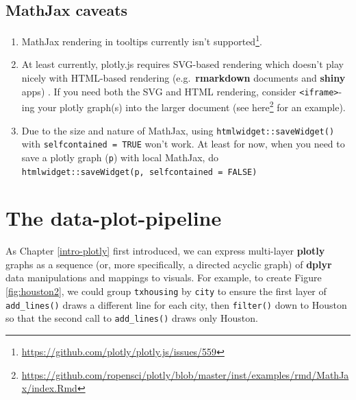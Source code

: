 \documentclass[
  12pt,
]{krantz}
\renewcommand{\href}[2]{#2\footnote{\url{#1}}}
\begin{document}
\hypertarget{mathjax-caveats}{%
\section{MathJax caveats}\label{mathjax-caveats}}

\begin{enumerate}
\def\labelenumi{\arabic{enumi}.}
\item
  MathJax rendering in tooltips \href{https://github.com/plotly/plotly.js/issues/559}{currently isn't supported}.
\item
  At least currently, plotly.js requires SVG-based rendering which doesn't play nicely with HTML-based rendering (e.g.~\textbf{rmarkdown} documents and \textbf{shiny} apps) . If you need both the SVG and HTML rendering, consider \texttt{\textless{}iframe\textgreater{}}-ing your plotly graph(s) into the larger document (see \href{https://github.com/ropensci/plotly/blob/master/inst/examples/rmd/MathJax/index.Rmd}{here} for an example).
\item
  Due to the size and nature of MathJax, using \texttt{htmlwidget::saveWidget()} with \texttt{selfcontained\ =\ TRUE} won't work. At least for now, when you need to save a plotly graph (\texttt{p}) with local MathJax, do \texttt{htmlwidget::saveWidget(p,\ selfcontained\ =\ FALSE)}
\end{enumerate}

\hypertarget{the-data-plot-pipeline}{%
\chapter{The data-plot-pipeline}\label{the-data-plot-pipeline}}


As Chapter \ref{intro-plotly} first introduced, we can express multi-layer \textbf{plotly} graphs as a sequence (or, more specifically, a directed acyclic graph) of \textbf{dplyr} data manipulations and mappings to visuals. For example, to create Figure \ref{fig:houston2}, we could group \texttt{txhousing} by \texttt{city} to ensure the first layer of \texttt{add\_lines()} draws a different line for each city, then \texttt{filter()} down to Houston so that the second call to \texttt{add\_lines()} draws only Houston.
\end{document}
